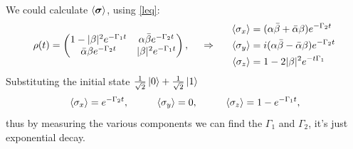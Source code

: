 We could calculate $\langle \boldsymbol{\sigma}\rangle$, using  \eqref{leq}:
\begin{equation*}
	\rho(t) = \begin{pmatrix}
	    1-|\beta|^2 e^{- \Gamma_1 t} & \alpha \bar{\beta} e^{-\Gamma_2 t} \\
	    \bar{\alpha} \beta e^{- \Gamma_2 t} & |\beta|^2 e^{-\Gamma_1 t} \\
	\end{pmatrix},
	\hspace{0.5cm} \Rightarrow \hspace{0.5cm}
	\left.\begin{aligned}
	   \langle \sigma_x\rangle &= (\alpha \bar{\beta} + \bar{\alpha} \beta ) e^{- \Gamma_2 t}\\
	   \langle \sigma_y\rangle &= i(\alpha \bar{\beta} - \bar{\alpha} \beta ) e^{- \Gamma_2 t} \\
	   \langle \sigma_z\rangle &= 1 - 2 |\beta|^2 e^{-t \Gamma_1}
	\end{aligned}\right.
\end{equation*}
Substituting the initial state $\tfrac{1}{\sqrt{2}}\left| 0 \right\rangle + \tfrac{1}{\sqrt{2}}\left| 1 \right\rangle$
\begin{equation*}
	\langle \sigma_x\rangle =  e^{- \Gamma_2 t},
	\hspace{10 mm} 
	\langle \sigma_y\rangle = 0,
	\hspace{10 mm}
	\langle \sigma_z\rangle = 1 - e^{- \Gamma_1 t},
\end{equation*}
thus by measuring the various components we can find the $\Gamma_1$ and $\Gamma_2$, it's just exponential decay.


